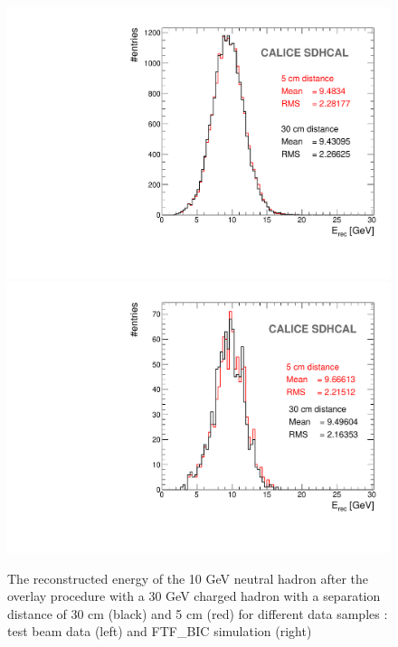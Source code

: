 \documentclass[cits]{JINST}
\begin{document}
\begin{figure}[!h]
  \begin{center}
    \includegraphics[width=0.45\linewidth]{plots/OverlayEvent/OverlayEvent_OverlayCheck_TB.pdf}
    \includegraphics[width=0.45\linewidth]{plots/OverlayEvent/OverlayEvent_OverlayCheck_FTF_BIC.pdf}
  \end{center}
  \caption{\label{OVERLAY_EVENT_MC_EREC_OVERLAID_HITS} The reconstructed energy of the 10 GeV neutral hadron after the overlay procedure with a 30 GeV charged hadron with a separation distance of 30 cm (black) and 5 cm (red) for different data samples : test beam data (left) and FTF\_BIC simulation (right)}
\end{figure}
\end{document}
